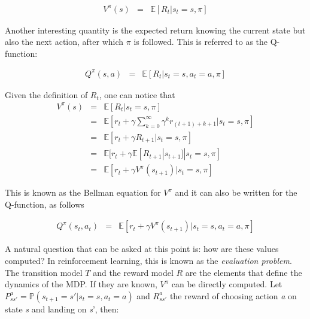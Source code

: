 					\begin{eqnarray}
						V^{\pi} (s) & = & \mathbb{E} [R_t | s_t = s, \pi] \label{eq:valuefunc}
					\end{eqnarray}
            
      	Another interesting quantity is the expected return knowing the current state but also the next action, after which $\pi$ is followed. This is referred to as the Q-function:
					
					\begin{eqnarray}
						Q^{\pi} (s,a) & = & \mathbb{E} [R_t | s_t = s, a_t = a, \pi] \label{eq:qfunc}
					\end{eqnarray}
            
       	Given the definition of $R_t$, one can notice that 
        \begin{eqnarray}
          	V^{\pi} (s)   & = & \mathbb{E} [R_t | s_t = s, \pi] \nonumber \\
           	& = & \mathbb{E} [r_t + \gamma \sum_{k=0}^\infty \gamma^k r_{(t+1)+k+1} | s_t = s, \pi] \nonumber \\
            & = & \mathbb{E} [r_t + \gamma R_{t+1} | s_t = s, \pi] \nonumber \\
						& = & \mathbb{E} [r_t + \gamma \mathbb{E} [R_{t+1}|s_{t+1}] | s_t = s, \pi] \nonumber \\
            & = & \mathbb{E} [r_t + \gamma V^{\pi} (s_{t+1}) | s_t = s, \pi] \label{eq:vbellman}
        \end{eqnarray}
            
     	This is known as the Bellman equation for $V^{\pi}$ and it can also be written for the Q-function, as follows
					
					\begin{eqnarray}
						Q^{\pi} (s_t,a_t) & = & \mathbb{E} [r_t + \gamma V^{\pi} (s_{t+1}) | s_t = s, a_t = a, \pi] \label{eq:qbellman}
					\end{eqnarray}
            
       	A natural question that can be asked at this point is: how are these values computed? In reinforcement learning, this is known as the \textit{evaluation problem}. The transition model $T$ and the reward model $R$ are the elements that define the dynamics of the MDP. If they are known, $V^{\pi}$ can be directly computed. Let $P_{ss'}^a = \mathbb{P} (s_{t+1} = s' | s_t = s, a_t = a)$ and $R_{ss'}^a$ the reward of choosing action \textit{a} on state \textit{s} and landing on \textit{s}', then:
        
